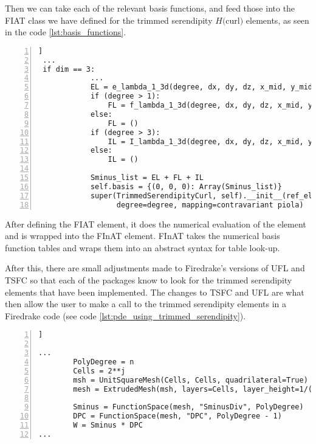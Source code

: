 \documentclass[manuscript,screen]{acmart}
\begin{document}
 Then we can take each of the relevant basis functions, and feed those into the FIAT class we have defined for the trimmed serendipity $H($curl$)$ elements, as seen in the code \ref{lst:basis_functions}.
 
\lstset{language=Python}
 \begin{lstlisting}[frame=single, caption={Collecting the basis functions for the trimmed serendipity class inside FIAT.}, label={lst:basis_functions}, numbers=left]] 
 ...
 if dim == 3:
            ...
            EL = e_lambda_1_3d(degree, dx, dy, dz, x_mid, y_mid, z_mid)
            if (degree > 1):
                FL = f_lambda_1_3d(degree, dx, dy, dz, x_mid, y_mid, z_mid)
            else:
                FL = ()
            if (degree > 3):
                IL = I_lambda_1_3d(degree, dx, dy, dz, x_mid, y_mid, z_mid)
            else:
                IL = ()

            Sminus_list = EL + FL + IL
            self.basis = {(0, 0, 0): Array(Sminus_list)}
            super(TrimmedSerendipityCurl, self).__init__(ref_el=ref_el,
                  degree=degree, mapping=contravariant piola)
\end{lstlisting}

After defining the FIAT element, it does the numerical evaluation of the element and is wrapped into the FInAT element.  FInAT takes the numerical basis function tables and wraps them into an abstract syntax for table look-up.    

After this, there are small adjustments made to Firedrake's versions of UFL and TSFC so that each of the packages know to look for the trimmed serendipity elements that have been implemented.  The changes to TSFC and UFL are what then allow the user to make a call to the trimmed serendipity elements in a Firedrake code (see code \ref{lst:pde_using_trimmed_serendipity}).

\lstset{language=Python}
\begin{lstlisting}[frame=single, caption={Setting up Firedrake to use the trimmed serendipity elements in a mixed Poisson problem in 3d.}, label={lst:pde_using_trimmed_serendipity}, numbers=left]] 

...
        PolyDegree = n
        Cells = 2**j
        msh = UnitSquareMesh(Cells, Cells, quadrilateral=True)
        mesh = ExtrudedMesh(msh, layers=Cells, layer_height=1/(Cells))

        Sminus = FunctionSpace(mesh, "SminusDiv", PolyDegree)
        DPC = FunctionSpace(mesh, "DPC", PolyDegree - 1)
        W = Sminus * DPC
...

\end{lstlisting}
\end{document}
